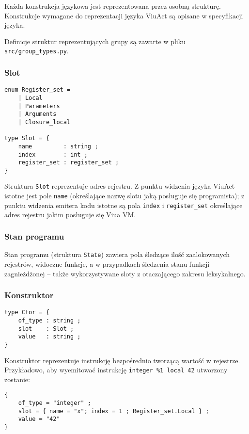 Każda konstrukcja językowa jest reprezentowana przez osobną strukturę. Konstrukcje wymagane do reprezentacji
języka ViuAct są opisane w specyfikacji języka.

Definicje struktur reprezentujących grupy są zawarte w pliku \texttt{src/group\_types.py}.

\subsubsection{Slot}
\label{diagram_klas_slot}

\begin{lstlisting}
enum Register_set =
    | Local
    | Parameters
    | Arguments
    | Closure_local

type Slot = {
    name         : string ;
    index        : int ;
    register_set : register_set ;
}
\end{lstlisting}

Struktura \texttt{Slot} reprezentuje adres rejestru. Z punktu widzenia języka ViuAct istotne jest pole
\texttt{name} (określające nazwę slotu jaką posługuje się programista); z punktu widzenia emitera kodu istotne
są pola \texttt{index} i \texttt{register\_set} określające adres rejestru jakim posługuje się Viua VM.

\subsubsection{Stan programu}
\label{diagram_klas_stan_programu}

Stan programu (struktura \texttt{State}) zawiera pola śledzące ilość zaalokowanych rejestrów, widoczne
funkcje, a w przypadkach śledzenia stanu funkcji zagnieżdżonej -- także wykorzystywane sloty z otaczającego
zakresu leksykalnego.

\subsubsection{Konstruktor}
\label{diagram_klas_konstruktor}

\begin{lstlisting}
type Ctor = {
    of_type : string ;
    slot    : Slot ;
    value   : string ;
}
\end{lstlisting}

Konstruktor reprezentuje instrukcję bezpośrednio tworzącą wartość w rejestrze. Przykładowo, aby wyemitować
instrukcję \texttt{integer \%1 local 42} utworzony zostanie:

\begin{lstlisting}
{
    of_type = "integer" ;
    slot = { name = "x"; index = 1 ; Register_set.Local } ;
    value = "42"
}
\end{lstlisting}

